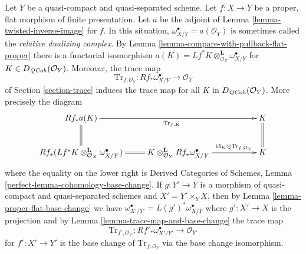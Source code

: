 \begin{remark}
\label{remark-relative-dualizing-complex}
Let $Y$ be a quasi-compact and quasi-separated scheme.
Let $f : X \to Y$ be a proper, flat morphism of finite presentation.
Let $a$ be the adjoint of Lemma \ref{lemma-twisted-inverse-image} for $f$.
In this situation, $\omega_{X/Y}^\bullet = a(\mathcal{O}_Y)$
is sometimes called the {\it relative dualizing complex}. By
Lemma \ref{lemma-compare-with-pullback-flat-proper}
there is a functorial isomorphism
$a(K) = Lf^*K \otimes_{\mathcal{O}_X}^\mathbf{L} \omega_{X/Y}^\bullet$
for $K \in D_{\mathit{QCoh}}(\mathcal{O}_Y)$. Moreover, the trace map
$$
\text{Tr}_{f, \mathcal{O}_Y} : Rf_*\omega_{X/Y}^\bullet \to \mathcal{O}_Y
$$
of Section \ref{section-trace} induces the trace map for all $K$
in $D_{\mathit{QCoh}}(\mathcal{O}_Y)$. More precisely the diagram
$$
\xymatrix{
Rf_*a(K) \ar[rrr]_{\text{Tr}_{f, K}} \ar@{=}[d] & & &
K \ar@{=}[d] \\
Rf_*(Lf^*K \otimes_{\mathcal{O}_X}^\mathbf{L} \omega_{X/Y}^\bullet)
\ar@{=}[r] &
K \otimes_{\mathcal{O}_Y}^\mathbf{L} Rf_*\omega_{X/Y}^\bullet
\ar[rr]^-{\text{id}_K \otimes \text{Tr}_{f, \mathcal{O}_Y}} & & K
}
$$
where the equality on the lower right is
Derived Categories of Schemes, Lemma \ref{perfect-lemma-cohomology-base-change}.
If $g : Y' \to Y$ is a
morphism of quasi-compact and quasi-separated schemes
and $X' = Y' \times_Y X$, then by
Lemma \ref{lemma-proper-flat-base-change} we have
$\omega_{X'/Y'}^\bullet = L(g')^*\omega_{X/Y}^\bullet$ where $g' : X' \to X$
is the projection and by Lemma \ref{lemma-trace-map-and-base-change}
the trace map
$$
\text{Tr}_{f', \mathcal{O}_{Y'}} :
Rf'_*\omega_{X'/Y'}^\bullet \to \mathcal{O}_{Y'}
$$
for $f' : X' \to Y'$ is the base change of $\text{Tr}_{f, \mathcal{O}_Y}$
via the base change isomorphism.
\end{remark}

